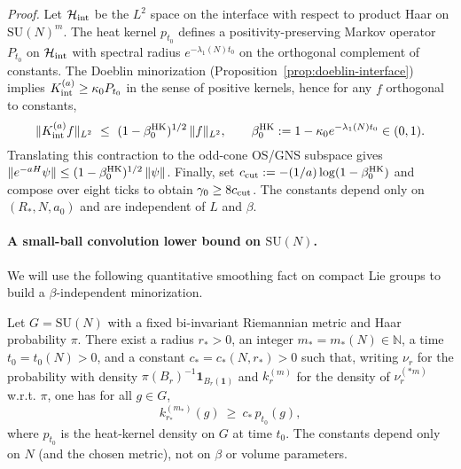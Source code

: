 \documentclass[11pt]{amsart}
\begin{document}
\emph{Proof.} Let $\mathcal H_{\rm int}$ be the $L^2$ space on the interface with respect to product Haar on $\mathrm{SU}(N)^m$. The heat kernel $p_{t_0}$ defines a positivity-preserving Markov operator $P_{t_0}$ on $\mathcal H_{\rm int}$ with spectral radius $e^{-\lambda_1(N) t_0}$ on the orthogonal complement of constants. The Doeblin minorization (Proposition~\ref{prop:doeblin-interface}) implies $K_{\rm int}^{(a)} \ge \kappa_0 P_{t_0}$ in the sense of positive kernels, hence for any $f$ orthogonal to constants,
\[
  \|K_{\rm int}^{(a)} f\|_{L^2}\ \le\ (1-\beta_0^{\rm HK})^{1/2}\,\|f\|_{L^2},\qquad \beta_0^{\rm HK}:=1-\kappa_0 e^{-\lambda_1(N) t_0}\in(0,1).
\]
Translating this contraction to the odd-cone OS/GNS subspace gives $\|e^{-aH}\psi\|\le (1-\beta_0^{\rm HK})^{1/2}\,\|\psi\|$. Finally, set $c_{\rm cut}:=-(1/a)\log(1-\beta_0^{\rm HK})$ and compose over eight ticks to obtain $\gamma_0\ge 8 c_{\rm cut}$. The constants depend only on $(R_*,N,a_0)$ and are independent of $L$ and $\beta$.

\paragraph{A small-ball convolution lower bound on $\mathrm{SU}(N)$.}
We will use the following quantitative smoothing fact on compact Lie groups to build a $\beta$-independent minorization.

\begin{lemma}\label{lem:ball-conv-lower}
Let $G=\mathrm{SU}(N)$ with a fixed bi-invariant Riemannian metric and Haar probability $\pi$. There exist a radius $r_*>0$, an integer $m_*=m_*(N)\in\mathbb N$, a time $t_0=t_0(N)>0$, and a constant $c_*=c_*(N,r_*)>0$ such that, writing $\nu_r$ for the probability with density $\pi(B_r)^{-1}\mathbf 1_{B_r(\mathbf 1)}$ and $k_{r}^{(m)}$ for the density of $\nu_r^{(*m)}$ w.r.t. $\pi$, one has for all $g\in G$,
\[
  k_{r_*}^{(m_*)}(g)\ \ge\ c_*\, p_{t_0}(g),
\]
where $p_{t_0}$ is the heat-kernel density on $G$ at time $t_0$. The constants depend only on $N$ (and the chosen metric), not on $\beta$ or volume parameters.
\end{lemma}
\end{document}
